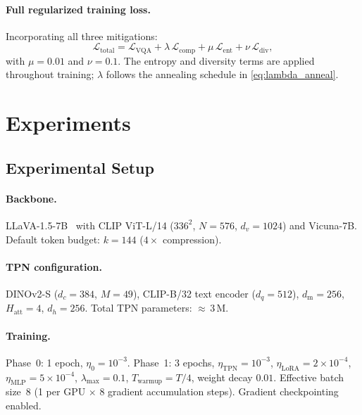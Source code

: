 \documentclass[11pt,a4paper]{article}
\begin{document}
\paragraph{Full regularized training loss.} Incorporating all three mitigations:
\begin{equation}
  \mathcal{L}_{\mathrm{total}}
  = \mathcal{L}_{\mathrm{VQA}}
  + \lambda\,\mathcal{L}_{\mathrm{comp}}
  + \mu\,\mathcal{L}_{\mathrm{ent}}
  + \nu\,\mathcal{L}_{\mathrm{div}},
  \label{eq:full_loss}
\end{equation}
with $\mu{=}0.01$ and $\nu{=}0.1$. The entropy and diversity terms are applied
throughout training; $\lambda$ follows the annealing schedule in
\cref{eq:lambda_anneal}.

\section{Experiments}
\label{sec:experiments}

\subsection{Experimental Setup}

\paragraph{Backbone.} LLaVA-1.5-7B~\citep{liu2024llava} with CLIP ViT-L/14
($336^2$, $N{=}576$, $d_v{=}1024$) and Vicuna-7B. Default token budget:
$k{=}144$ ($4{\times}$ compression).

\paragraph{TPN configuration.}
DINOv2-S ($d_c{=}384$, $M{=}49$), CLIP-B/32 text encoder ($d_q{=}512$),
$d_{\mathrm{m}}{=}256$, $H_{\mathrm{att}}{=}4$, $d_h{=}256$. Total TPN
parameters: ${\approx}\,3$\,M.

\paragraph{Training.} Phase~0: 1 epoch, $\eta_0{=}10^{-3}$. Phase~1: 3 epochs,
$\eta_{\mathrm{TPN}}{=}10^{-3}$, $\eta_{\mathrm{LoRA}}{=}2{\times}10^{-4}$,
$\eta_{\mathrm{MLP}}{=}5{\times}10^{-4}$, $\lambda_{\max}{=}0.1$,
$T_{\mathrm{warmup}}{=}T/4$, weight decay $0.01$. Effective batch size~8
(1 per GPU $\times$ 8 gradient accumulation steps). Gradient checkpointing enabled.
\end{document}
